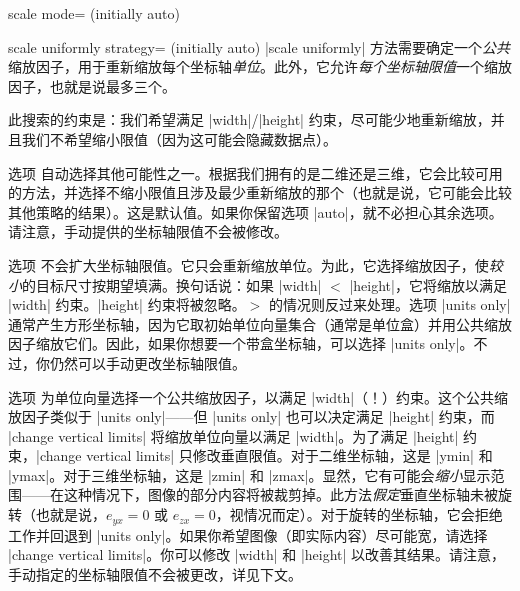 \begin{pgfplotskey}{scale mode= (initially auto)}
    \begin{pgfplotskey}{scale uniformly strategy= (initially auto)%
    }
        |scale uniformly| 方法需要确定一个\emph{公共}缩放因子，用于重新缩放每个坐标轴\emph{单位}。此外，它允许\emph{每个坐标轴限值}一个缩放因子，也就是说最多三个。

        此搜索的约束是：我们希望满足 |width|/|height| 约束，尽可能少地重新缩放，并且我们不希望缩小限值（因为这可能会隐藏数据点）。

        选项  自动选择其他可能性之一。根据我们拥有的是二维还是三维，它会比较可用的方法，并选择不缩小限值且涉及最少重新缩放的那个（也就是说，它可能会比较其他策略的结果）。这是默认值。如果你保留选项 |auto|，就不必担心其余选项。请注意，手动提供的坐标轴限值不会被修改。

        选项  不会扩大坐标轴限值。它只会重新缩放单位。为此，它选择缩放因子，使\emph{较小}的目标尺寸按期望填满。换句话说：如果 |width| $<$ |height|，它将缩放以满足 |width| 约束。|height| 约束将被忽略。$>$ 的情况则反过来处理。选项 |units only| 通常产生方形坐标轴，因为它取初始单位向量集合（通常是单位盒）并用公共缩放因子缩放它们。因此，如果你想要一个带盒坐标轴，可以选择 |units only|。不过，你仍然可以手动更改坐标轴限值。

        选项  为单位向量选择一个公共缩放因子，以满足 |width|（！）约束。这个公共缩放因子类似于 |units only|——但 |units only| 也可以决定满足 |height| 约束，而 |change vertical limits| 将缩放单位向量以满足 |width|。为了满足 |height| 约束，|change vertical limits| 只修改垂直限值。对于二维坐标轴，这是 |ymin| 和 |ymax|。对于三维坐标轴，这是 |zmin| 和 |zmax|。显然，它有可能会\emph{缩小}显示范围——在这种情况下，图像的部分内容将被裁剪掉。此方法\emph{假定}垂直坐标轴未被旋转（也就是说，$e_{yx}=0$ 或 $e_{zx}=0$，视情况而定）。对于旋转的坐标轴，它会拒绝工作并回退到 |units only|。如果你希望图像（即实际内容）尽可能宽，请选择 |change vertical limits|。你可以修改 |width| 和 |height| 以改善其结果。请注意，手动指定的坐标轴限值不会被更改，详见下文。


\end{pgfplotskey}
\end{pgfplotskey}
